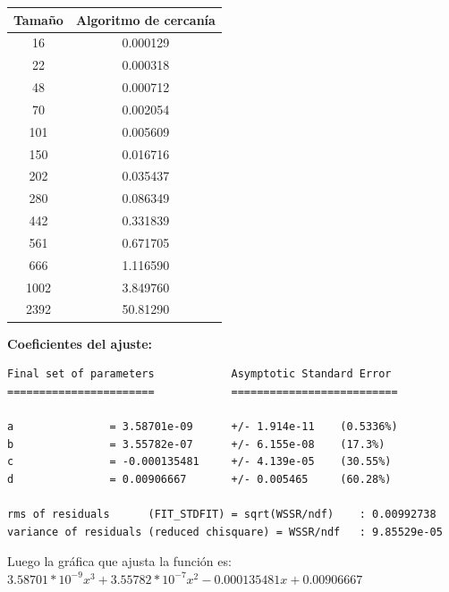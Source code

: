 \documentclass[a4]{article}
\begin{document}
\begin{tabular}{|c|c|} \hline
\textbf{Tamaño}& 
\textbf{Algoritmo de cercanía}
  \\ \hline
     16      & 0.000129  \\
     22      & 0.000318  \\
     48      & 0.000712  \\
     70      & 0.002054  \\
     101     & 0.005609            \\
     150     & 0.016716  \\
     202     & 0.035437  \\
     280     & 0.086349    \\
     442     & 0.331839    \\
     561     & 0.671705  \\
     666     & 1.116590       \\
     1002    & 3.849760  \\
     2392    & 50.81290   \\
\hline
\end{tabular}

\vspace{5mm}
\textbf{Coeficientes del ajuste:}
\begin{verbatim}
Final set of parameters            Asymptotic Standard Error
=======================            ==========================

a               = 3.58701e-09      +/- 1.914e-11    (0.5336%)
b               = 3.55782e-07      +/- 6.155e-08    (17.3%)
c               = -0.000135481     +/- 4.139e-05    (30.55%)
d               = 0.00906667       +/- 0.005465     (60.28%)

rms of residuals      (FIT_STDFIT) = sqrt(WSSR/ndf)    : 0.00992738
variance of residuals (reduced chisquare) = WSSR/ndf   : 9.85529e-05
\end{verbatim}

Luego la gráfica que ajusta la función es:  $3.58701*10^{-9}x^3 + 3.55782*10^{-7}x^2 - 0.000135481x + 0.00906667$ 

\begin{figure}[H]
  \centering
{}
\end{figure}
\end{document}
